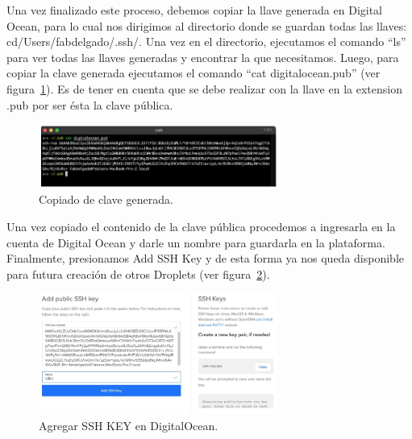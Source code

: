 Una vez finalizado este proceso, debemos copiar la llave generada en Digital Ocean, para lo cual nos dirigimos al directorio donde se guardan todas las llaves: cd/Users/fabdelgado/.ssh/. Una vez en el directorio, ejecutamos el comando “ls” para ver todas las llaves generadas y encontrar la que necesitamos. Luego, para copiar la clave generada ejecutamos el comando “cat digitalocean.pub” (ver figura~\ref{Img:Copiado+de+clave+generada}). Es de tener en cuenta que se debe realizar con la llave en la extension .pub por ser ésta la clave pública.

\begin{figure}[h]
    \centering
    \includegraphics[width=0.7\textwidth]{img/infraestructura/copiado-ssh-key.png}
    \caption{Copiado de clave generada.} \label{Img:Copiado+de+clave+generada}
\end{figure} 

Una vez copiado el contenido de la clave pública procedemos a ingresarla en la cuenta de Digital Ocean y darle un nombre para guardarla en la plataforma. Finalmente, presionamos Add SSH Key y de esta forma ya nos queda disponible para futura creación de otros Droplets (ver figura~\ref{Img:Agregar+SSH+KEY+en+DigitalOcean}).

\newpage
\begin{figure}[h]
    \centering
    \includegraphics[width=0.7\textwidth]{img/infraestructura/agregar-ssh-key-digital-ocean.png}
    \caption{Agregar SSH KEY en DigitalOcean.} \label{Img:Agregar+SSH+KEY+en+DigitalOcean}
\end{figure} 


